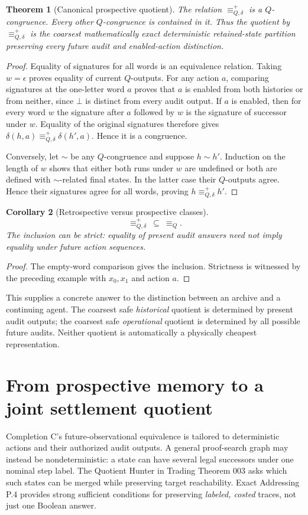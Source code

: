 \documentclass[11pt,letterpaper]{article}
\newtheorem{theorem}{Theorem}[section]
\newtheorem{corollary}[theorem]{Corollary}
\theoremstyle{definition}
\begin{document}
\begin{theorem}[Canonical prospective quotient]\label{thm:future}
The relation $\equiv_{Q,\delta}^{+}$ is a $Q$-congruence. Every other $Q$-congruence is contained in it. Thus the quotient by $\equiv_{Q,\delta}^{+}$ is the coarsest \emph{mathematically exact} deterministic retained-state partition preserving every future audit and enabled-action distinction.
\end{theorem}
\begin{proof}
Equality of signatures for all words is an equivalence relation. Taking $w=\epsilon$ proves equality of current $Q$-outputs. For any action $a$, comparing signatures at the one-letter word $a$ proves that $a$ is enabled from both histories or from neither, since $\bot$ is distinct from every audit output. If $a$ is enabled, then for every word $w$ the signature after $a$ followed by $w$ is the signature of successor under $w$. Equality of the original signatures therefore gives $\delta(h,a)\equiv_{Q,\delta}^{+}\delta(h',a)$. Hence it is a congruence.

Conversely, let $\sim$ be any $Q$-congruence and suppose $h\sim h'$. Induction on the length of $w$ shows that either both runs under $w$ are undefined or both are defined with $\sim$-related final states. In the latter case their $Q$-outputs agree. Hence their signatures agree for all words, proving $h\equiv_{Q,\delta}^{+}h'$.
\end{proof}

\begin{corollary}[Retrospective versus prospective classes]
\[
\equiv_{Q,\delta}^{+}\ \subseteq\ \equiv_Q.
\]
The inclusion can be strict: equality of present audit answers need not imply equality under future action sequences.
\end{corollary}
\begin{proof}
The empty-word comparison gives the inclusion. Strictness is witnessed by the preceding example with $x_0,x_1$ and action $a$.
\end{proof}

This supplies a concrete answer to the distinction between an archive and a continuing agent. The coarsest safe \emph{historical} quotient is determined by present audit outputs; the coarsest safe \emph{operational} quotient is determined by all possible future audits. Neither quotient is automatically a physically cheapest representation.

\section{From prospective memory to a joint settlement quotient}\label{sec:joint}
Completion C's future-observational equivalence is tailored to deterministic actions and their authorized audit outputs. A general proof-search graph may instead be nondeterministic: a state can have several legal successors under one nominal step label. The Quotient Hunter in Trading Theorem 003 asks which such states can be merged while preserving target reachability. Exact Addressing P.4 provides strong sufficient conditions for preserving \emph{labeled, costed} traces, not just one Boolean answer.
\end{document}

